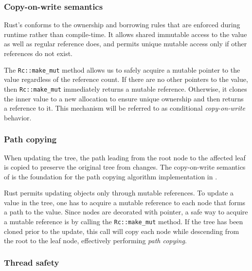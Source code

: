 \subsubsection*{Copy-on-write semantics}
Rust’s \rc{} conforms to the ownership and borrowing rules that are enforced during runtime rather than compile-time. It allows shared immutable access to the value as well as regular reference does, and permits unique mutable access only if other references do not exist.

The \texttt{Rc::make_mut} method allows us to safely acquire a mutable pointer to the value regardless of the reference count. If there are no other pointers to the value, then \texttt{Rc::make_mut} immediately returns a mutable reference. Otherwise, it clones the inner value to a new allocation to ensure unique ownership and then returns a reference to it. This mechanism will be referred to as conditional \emph{copy-on-write} behavior.

\subsubsection*{Path copying}

When updating the tree, the path leading from the root node to the affected leaf is copied to preserve the original tree from changes. The copy-on-write semantics of \rc{} is the foundation for the path copying algorithm implementation in \rrbtree{}.

Rust permits updating objects only through mutable references. To update a value in the tree, one has to acquire a mutable reference to each node that forms a path to the value. Since nodes are decorated with \rc{} pointer, a safe way to acquire a mutable reference is by calling the \texttt{Rc::make_mut} method. If the tree has been cloned prior to the update, this call will copy each node while descending from the root to the leaf node, effectively performing \emph{path copying}.

\subsubsection*{Thread safety}

